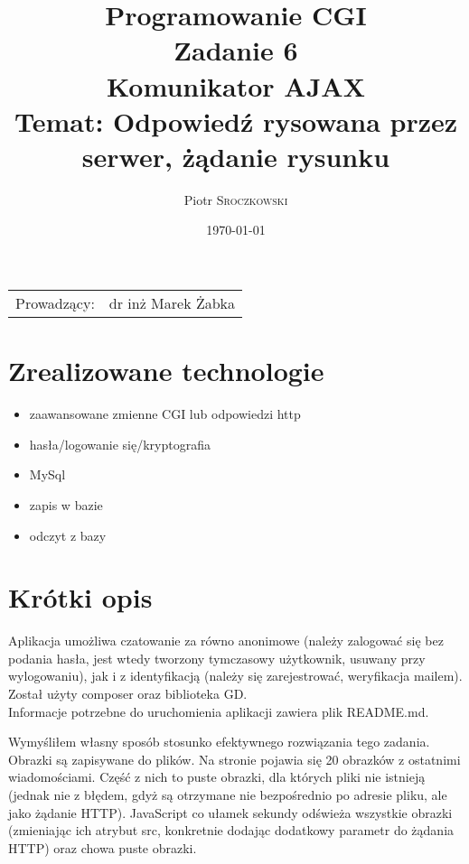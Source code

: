 \documentclass{article}
\title{Programowanie CGI \\ Zadanie 6 \\ Komunikator AJAX \\ Temat: Odpowiedź rysowana przez serwer, żądanie rysunku} %
\author{Piotr \textsc{Sroczkowski}} %
\date{\today} %
\begin{document}
\maketitle %

\begin{center}
\begin{tabular}{l r}
Prowadzący: & dr inż Marek Żabka %
\end{tabular}
\end{center}



\section{Zrealizowane technologie}
\begin{itemize}
\item zaawansowane zmienne CGI lub odpowiedzi http
\item hasła/logowanie się/kryptografia
\item MySql
\item zapis w bazie
\item odczyt z bazy
\end{itemize}

\section{Krótki opis}
Aplikacja umożliwa czatowanie za równo anonimowe (należy zalogować się bez podania hasła,
jest wtedy tworzony tymczasowy użytkownik, usuwany przy wylogowaniu), jak i z identyfikacją
(należy się zarejestrować, weryfikacja mailem).\\

Został użyty composer oraz biblioteka GD.\\
Informacje potrzebne do uruchomienia aplikacji zawiera plik README.md.

Wymyśliłem własny sposób stosunko efektywnego rozwiązania tego zadania. Obrazki są
zapisywane do plików. Na stronie pojawia się 20 obrazków z ostatnimi wiadomościami.
Część z nich to puste obrazki, dla których pliki nie istnieją (jednak nie z błędem,
gdyż są otrzymane nie bezpośrednio po adresie pliku, ale jako żądanie HTTP).
JavaScript co ułamek sekundy odświeża wszystkie obrazki (zmieniając ich atrybut src,
konkretnie dodając dodatkowy parametr do żądania HTTP) oraz chowa puste obrazki.
\end{document}
